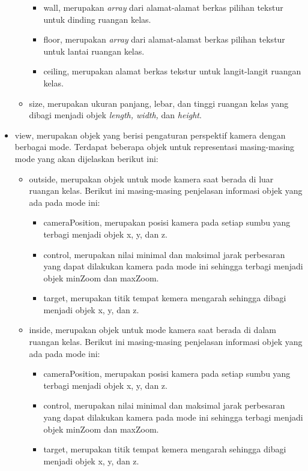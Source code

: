\begin{itemize}
\begin{itemize}
			\begin{itemize}
				\item wall, merupakan {\it array} dari alamat-alamat berkas pilihan tekstur untuk dinding ruangan kelas.
				\item floor, merupakan {\it array} dari alamat-alamat berkas pilihan tekstur untuk lantai ruangan kelas.
				\item ceiling, merupakan alamat berkas tekstur untuk langit-langit ruangan kelas.
			\end{itemize}
			\item size, merupakan ukuran panjang, lebar, dan tinggi ruangan kelas yang dibagi menjadi objek {\it length, width,} dan {\it height}.
		\end{itemize}
	\item view, merupakan objek yang berisi pengaturan perspektif kamera dengan berbagai mode. Terdapat beberapa objek untuk representasi masing-masing mode yang akan dijelaskan berikut ini:
		\begin{itemize}
			\item outside, merupakan objek untuk mode kamera saat berada di luar ruangan kelas. Berikut ini masing-masing penjelasan informasi objek yang ada pada mode ini:
			\begin{itemize}
				\item cameraPosition, merupakan posisi kamera pada setiap sumbu yang terbagi menjadi objek x, y, dan z.
				\item control, merupakan nilai minimal dan maksimal jarak perbesaran yang dapat dilakukan kamera pada mode ini sehingga terbagi menjadi objek minZoom dan maxZoom.
				\item target, merupakan titik tempat kemera mengarah sehingga dibagi menjadi objek x, y, dan z.
			\end{itemize}
			\item inside, merupakan objek untuk mode kamera saat berada di dalam ruangan kelas. Berikut ini masing-masing penjelasan informasi objek yang ada pada mode ini:
			\begin{itemize}
				\item cameraPosition, merupakan posisi kamera pada setiap sumbu yang terbagi menjadi objek x, y, dan z.
				\item control, merupakan nilai minimal dan maksimal jarak perbesaran yang dapat dilakukan kamera pada mode ini sehingga terbagi menjadi objek minZoom dan maxZoom.
				\item target, merupakan titik tempat kemera mengarah sehingga dibagi menjadi objek x, y, dan z.

\end{itemize}
\end{itemize}
\end{itemize}
